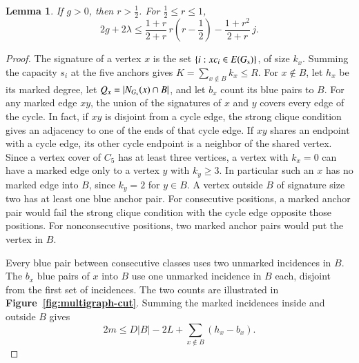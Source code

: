 \documentclass[preprint,11pt,numbers]{elsarticle-arxiv}
\numberwithin{equation}{section}
\newtheorem{lemma}[theorem]{Lemma}
\theoremstyle{definition}
\begin{document}
\begin{lemma}\label{lem:multigraph-cycle-counts}
If $g>0$, then $r>\frac{1}{2}$. For $\frac{1}{2}\le r\le1$,
\begin{equation}\label{eq:multi-joint}
 2g+2\lambda\le
 \frac{1+r}{2+r}\,r\left(r-\frac{1}{2}\right)
 -\frac{1+r^2}{2+r}\,j.
\end{equation}
\end{lemma}
\begin{proof}
The signature of a vertex $x$ is the set $\{i:xc_i\in E(G_{\rm s})\}$,
of size $k_x$. Summing the capacity $s_i$ at the five anchors gives
$K=\sum_{x\notin B}k_x\le R$. For $x\notin B$, let $h_x$ be its marked
degree, let $Q_x=|N_{G_{\rm s}}(x)\cap B|$, and let $b_x$ count its
blue pairs to $B$. For any marked edge $xy$, the union of the
signatures of $x$ and $y$ covers every edge of the cycle. In fact,
if $xy$ is disjoint from a cycle edge, the strong clique condition
gives an adjacency to one of the ends of that cycle edge. If $xy$
shares an endpoint with a cycle edge, its other cycle endpoint is
a neighbor of the shared vertex. Since a vertex cover of $C_5$ has
at least three vertices, a vertex with $k_x=0$ can have a marked
edge only to a vertex $y$ with $k_y\ge3$. In particular such an $x$
has no marked edge into $B$, since $k_y=2$ for $y\in B$.
A vertex outside $B$ of signature size two has at least one blue anchor pair. For
consecutive positions, a marked anchor pair would fail the strong
clique condition with the cycle edge opposite those positions. For
nonconsecutive positions, two marked anchor pairs would put the vertex
in $B$.

Every blue pair between consecutive classes uses two unmarked incidences
in $B$. The $b_x$ blue pairs of $x$ into $B$ use one unmarked incidence
in $B$ each, disjoint from the first set of incidences. The two
counts are illustrated in \textbf{Figure~\ref{fig:multigraph-cut}}.
Summing the marked incidences inside and outside $B$ gives
\begin{equation}\label{eq:multi-core-cut}
 2m\le D|B|-2L+\sum_{x\notin B}(h_x-b_x).
\end{equation}


\end{proof}
\end{document}
